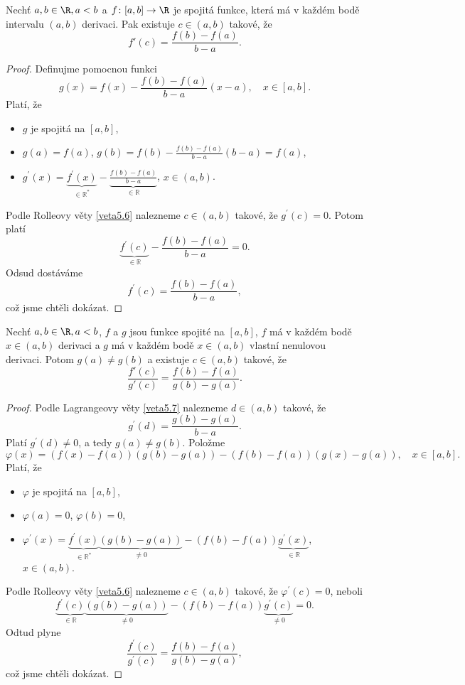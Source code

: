 \begin{veta}[Lagrange] \label{veta5.7}
Nechť $a,b \in \R, a<b$ a $f\colon[a,b]\to\R$ je spojitá funkce, která má v každém bodě intervalu $(a,b)$ derivaci. Pak existuje $c\in(a,b)$ takové, že
\[
 f'(c)=\frac{f(b)-f(a)}{b-a}.
\]
\end{veta}

\begin{proof}
Definujme pomocnou funkci
$$
    g(x)=f(x) - \frac{f(b)-f(a)}{b-a}(x-a), \quad x \in \left [ a,b \right ] .
$$
Platí, že
\begin{itemize}
	\item $g$ je spojitá na $\left [ a,b \right ] $,
	\item $g(a)= f(a)$, $g(b)=f(b)-\frac{f(b)-f(a)}{b-a}(b-a)=f(a)$,
\item $g^\prime(x)=\underbrace{f^\prime(x)}_{\in \mathbb R ^*}-\underbrace{\frac{f(b)-f(a)}{b-a}}_{\in \mathbb R }$, $x \in (a,b)$.
\end{itemize}
Podle Rolleovy věty \ref{veta5.6} nalezneme $c\in(a,b)$ takové, že $g^\prime(c)=0$. Potom platí
$$
    \underbrace{f^\prime(c)}_{\in \mathbb R }-\frac{f(b)-f(a)}{b-a}=0.
$$
Odsud dostáváme
$$
    f^\prime(c)=\frac{f(b)-f(a)}{b-a},
$$
což jsme chtěli dokázat.
\end{proof}

\begin{veta}[Cauchy] \label{veta5.8}
Nechť $a,b \in \R, a<b$, $f$ a $g$ jsou funkce spojité na $[a,b]$, $f$ má v každém bodě $x\in(a,b)$ derivaci a $g$ má v každém bodě $x\in(a,b)$ vlastní nenulovou derivaci. Potom $g(a)\ne g(b)$ a existuje $c\in(a,b)$ takové, že
\[
 \frac{f'(c)}{g'(c)}=\frac{f(b)-f(a)}{g(b)-g(a)}.
\]
\end{veta}

\begin{proof}
	Podle Lagrangeovy věty \ref{veta5.7} nalezneme $d \in (a,b)$ takové, že
	$$
	    g^\prime(d)=\frac{g(b)-g(a)}{b-a}.
	$$
	Platí $g^\prime(d)\ne 0$, a tedy $g(a)\ne g(b)$. Položme
	$$
	\varphi(x) = (f(x)-f(a))(g(b)-g(a))-(f(b)-f(a))(g(x)-g(a)), \quad x \in \left [ a,b \right ].
	$$
	Platí, že
	\begin{itemize}
		\item $\varphi$ je spojitá na $\left [ a,b \right ] $,
		\item $\varphi(a)=0$, $\varphi(b)=0$,
		\item $\varphi^\prime(x)=\underbrace{f^\prime(x)}_{\in \mathbb R ^*}\underbrace{(g(b)-g(a))}_{\ne 0}-(f(b)-f(a))\underbrace{g^\prime(x)}_{\in \mathbb R}$, $x \in (a,b)$.
	\end{itemize}
	Podle Rolleovy věty \ref{veta5.6} nalezneme $c \in (a,b)$ takové, že $\varphi^\prime(c)=0$,
	neboli
	$$
	    \underbrace{f^\prime(c)}_{\in \mathbb R }\underbrace{(g(b)-g(a))}_{\ne 0}-(f(b)-f(a))\underbrace{g^\prime(c)}_{\ne 0}=0.
	$$
	Odtud plyne
	$$
 \frac{f^\prime(c)}{g^\prime(c)}=\frac{f(b)-f(a)}{g(b)-g(a)},
	$$
	což jsme chtěli dokázat.
\end{proof}

